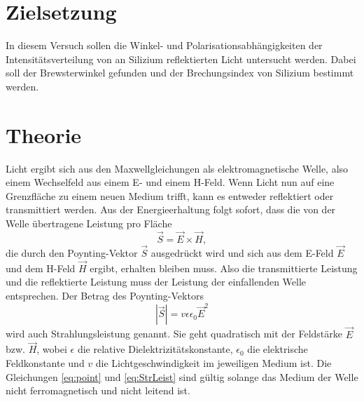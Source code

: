 \section{Zielsetzung}
In diesem Versuch sollen die Winkel- und Polarisationsabhängigkeiten der Intensitätsverteilung
von an Silizium reflektierten Licht untersucht werden. Dabei soll der Brewsterwinkel gefunden und
der Brechungsindex von Silizium bestimmt werden.
\section{Theorie}
\label{sec:Theorie}
Licht ergibt sich aus den Maxwellgleichungen als elektromagnetische
Welle, also einem Wechselfeld aus einem E- und einem H-Feld. Wenn Licht nun auf eine
Grenzfläche zu einem neuen Medium trifft, kann es entweder reflektiert oder transmittiert werden.
Aus der Energieerhaltung folgt sofort, dass die von der Welle übertragene Leistung pro Fläche
\begin{equation}
    \vec{S}=\vec{E} \times \vec{H},
    \label{eq:point}
\end{equation}
die durch den Poynting-Vektor $\vec{S}$ ausgedrückt wird und sich aus dem E-Feld $\vec{E}$ und dem H-Feld
$\vec{H}$ ergibt, erhalten bleiben muss. Also die transmittierte Leistung und die reflektierte Leistung
muss der Leistung der einfallenden Welle entsprechen. Der Betrag des Poynting-Vektors
\begin{equation}
    \left|\vec{S}\right|=v\epsilon \epsilon_0 \vec{E}^2
    \label{eq:StrLeist}
\end{equation}
wird auch Strahlungsleistung genannt. Sie geht quadratisch mit der Feldstärke $\vec{E}$ bzw. $\vec{H}$, wobei
$\epsilon$ die relative Dielektrizitätskonstante, $\epsilon_0$ die elektrische Feldkonstante und $v$ die Lichtgeschwindigkeit im jeweiligen Medium ist.
Die Gleichungen \eqref{eq:point} und \eqref{eq:StrLeist} sind gültig solange das Medium der Welle nicht ferromagnetisch und
nicht leitend ist.



